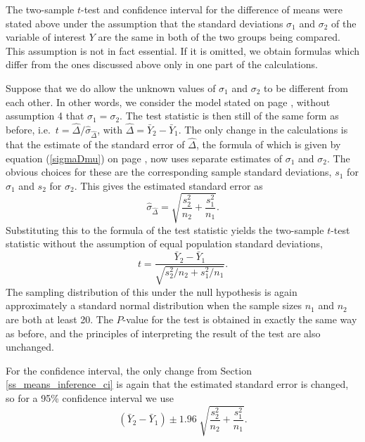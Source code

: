 The two-sample $t$-test and confidence interval for the difference of
means were stated above under the assumption that the standard
deviations $\sigma_{1}$ and $\sigma_{2}$ of the variable of interest $Y$
are the same in both of the two groups being compared. This
assumption is not in fact essential. If it is omitted, we obtain
formulas which differ from the ones discussed above only in one part of
the calculations.

Suppose that we do allow the unknown values of $\sigma_{1}$ and $\sigma_{2}$ to be
different from each other. In other words, we consider the model stated
on page \pageref{p_2sample}, without assumption 4 that
$\sigma_{1}=\sigma_{2}$. The test
statistic is then still of the same form as before, i.e.\
$t=\hat{\Delta}/\hat{\sigma}_{\hat{\Delta}}$, with
$\hat{\Delta}=\bar{Y}_{2}-\bar{Y}_{1}$. The only change in the
calculations is that the estimate of the standard error of $\hat{\Delta}$, the formula
of which is given by equation (\ref{sigmaDmu}) on page
\pageref{sigmaDmu},  now uses separate estimates of $\sigma_{1}$ and
$\sigma_{2}$. The obvious choices for these are the
corresponding sample standard deviations, $s_{1}$ for $\sigma_{1}$ and
$s_{2}$ for $\sigma_{2}$. This gives the estimated standard error as
\begin{equation}
\hat{\sigma}_{\hat{\Delta}}=
\sqrt{
\frac{s_{2}^{2}}{n_{2}}+
\frac{s_{1}^{2}}{n_{1}}
}.
\label{seDmu_ne}
\end{equation}
Substituting this to the formula of the test statistic yields the
two-sample $t$-test statistic without the assumption of equal population
standard deviations,
\begin{equation}
t=
\frac{\bar{Y}_{2}-\bar{Y}_{1}}
{\sqrt{s^{2}_{2}/n_{2}+s^{2}_{1}/n_{1}}}.
\label{ztestmuD}
\end{equation}
The sampling distribution of this under the null hypothesis is again
approximately a standard normal distribution when the sample sizes
$n_{1}$ and $n_{2}$ are both at least 20. The $P$-value for the test is
obtained in exactly the same way as before, and the
principles of interpreting the result of the test are also
unchanged.

For the confidence interval, the only change from Section
\ref{ss_means_inference_ci} is again that the estimated standard error
is changed, so for a 95\% confidence interval we use
\begin{equation}
(\bar{Y}_{2}-\bar{Y}_{1}) \pm 1.96 \;
\sqrt{
\frac{s^{2}_{2}}{n_{2}}+\frac{s^{2}_{1}}{n_{1}}
}.
\label{ciDmu}
\end{equation}


